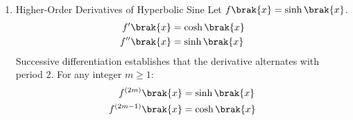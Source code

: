 \begin{enumerate}[label=\thesubsection.\arabic*, ref=\thesubsection.\theenumi]
	\begin{enumerate}
		\item For the system $\brak{\vec{A} - R\vec{I}}\vec{x} = \vec{b}$:
		Because $\vec{A} - R\vec{I}$ is singular ($\text{rank} < n$), the system will have infinitely many solutions if $\vec{b}$ is in the column space of $\vec{A} - R\vec{I}$, or no solution if it is not.
		
		\item For the system $\vec{A}\vec{x} = \vec{b}$:
		The number of solutions depends on $R$ and the remaining unknown eigenvalues of $\vec{A}$. If $R \neq 0$ and all other eigenvalues are non-zero ($\mydet{\vec{A}} \neq 0$), the system has a unique solution. If $R = 0$ or $0$ happens to be one of the other eigenvalues of $\vec{A}$, the matrix is singular, resulting in either no solution or infinitely many solutions.
	\end{enumerate}
	
\item Higher-Order Derivatives of Hyperbolic Sine
Let $f\brak{x} = \sinh\brak{x}$.
\begin{align}
	f'\brak{x} &= \cosh\brak{x} \label{eq:DA2025-sinh_diff1}
	\\
	f''\brak{x} &= \sinh\brak{x} \label{eq:DA2025-sinh_diff2}
\end{align}
Successive differentiation establishes that the derivative alternates with period $2$. For any integer $m \ge 1$:
\begin{align}
	f^{(2m)}\brak{x} &= \sinh\brak{x} \label{eq:DA2025-sinh_even_deriv}
	\\
	f^{(2m-1)}\brak{x} &= \cosh\brak{x} \label{eq:DA2025-sinh_odd_deriv}
\end{align}


\end{enumerate}
